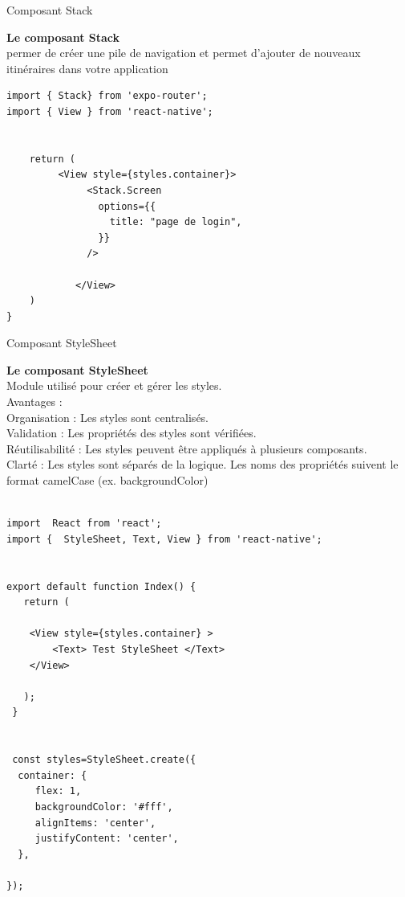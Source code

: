 \documentclass[5pt]{beamer}
\begin{document}
{\begin{frame}[fragile]{Composant Stack}
\begin{block}{}
\textbf{Le composant Stack}\\
permer de créer une pile de navigation et
permet d’ajouter de nouveaux itinéraires dans votre application
\begin{verbatim}
import { Stack} from 'expo-router';
import { View } from 'react-native';


    return (
         <View style={styles.container}>
              <Stack.Screen
                options={{
                  title: "page de login",
                }}
              />
             
            </View>
    )
}
\end{verbatim}
\end{block}
\end{frame}

\begin{frame}[fragile]{Composant StyleSheet}
\begin{block}{}
\textbf{Le composant StyleSheet}\\
Module utilisé pour créer et gérer les styles.\\
 Avantages :\\
 Organisation : Les styles sont centralisés.\\
 Validation : Les propriétés des styles sont vérifiées.\\
 Réutilisabilité : Les styles peuvent être appliqués à plusieurs
composants.\\
 Clarté : Les styles sont séparés de la logique.
 Les noms des propriétés suivent le format camelCase (ex.
backgroundColor)
\begin{verbatim}

import  React from 'react';
import {  StyleSheet, Text, View } from 'react-native';


export default function Index() {
   return (

    <View style={styles.container} >
      	<Text> Test StyleSheet </Text>
    </View>
    
   );
 }


 const styles=StyleSheet.create({
  container: {
     flex: 1,
     backgroundColor: '#fff',
     alignItems: 'center',
     justifyContent: 'center',
  },
  
});
\end{verbatim}
\end{block}
\end{frame}


}
\end{document}
